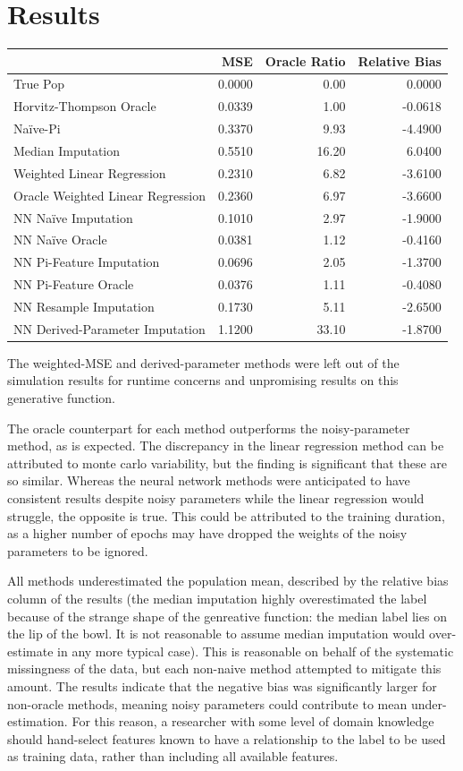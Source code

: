 \documentclass[12pt,twoside]{reedthesis}
\begin{document}
\section{Results}\label{sim_results}
\begin{table}[H]
\centering
\begin{tabular}{l|r|r|r}
\hline
  & MSE & Oracle Ratio & Relative Bias\\
\hline
True Pop & 0.0000 & 0.00 & 0.0000\\
\hline
Horvitz-Thompson Oracle & 0.0339 & 1.00 & -0.0618\\
\hline
Naïve-Pi & 0.3370 & 9.93 & -4.4900\\
\hline
Median Imputation & 0.5510 & 16.20 & 6.0400\\
\hline
Weighted Linear Regression & 0.2310 & 6.82 & -3.6100\\
\hline
Oracle Weighted Linear Regression & 0.2360 & 6.97 & -3.6600\\
\hline
NN  Naïve Imputation & 0.1010 & 2.97 & -1.9000\\
\hline
NN Naïve Oracle & 0.0381 & 1.12 & -0.4160\\
\hline
NN Pi-Feature Imputation & 0.0696 & 2.05 & -1.3700\\
\hline
NN Pi-Feature Oracle & 0.0376 & 1.11 & -0.4080\\
\hline
NN Resample Imputation & 0.1730 & 5.11 & -2.6500\\
\hline
NN Derived-Parameter Imputation & 1.1200 & 33.10 & -1.8700\\
\hline
\end{tabular}
\end{table}
The weighted-MSE and derived-parameter methods were left out of the
simulation results for runtime concerns and unpromising results on this
generative function.

The oracle counterpart for each method outperforms the noisy-parameter
method, as is expected. The discrepancy in the linear regression method
can be attributed to monte carlo variability, but the finding is
significant that these are so similar. Whereas the neural network
methods were anticipated to have consistent results despite noisy
parameters while the linear regression would struggle, the opposite is
true. This could be attributed to the training duration, as a higher
number of epochs may have dropped the weights of the noisy parameters to
be ignored.

All methods underestimated the population mean, described by the
relative bias column of the results (the median imputation highly
overestimated the label because of the strange shape of the genreative
function: the median label lies on the lip of the bowl. It is not
reasonable to assume median imputation would over-estimate in any more
typical case). This is reasonable on behalf of the systematic
missingness of the data, but each non-naive method attempted to mitigate
this amount. The results indicate that the negative bias was
significantly larger for non-oracle methods, meaning noisy parameters
could contribute to mean under-estimation. For this reason, a researcher
with some level of domain knowledge should hand-select features known to
have a relationship to the label to be used as training data, rather
than including all available features.
\end{document}
